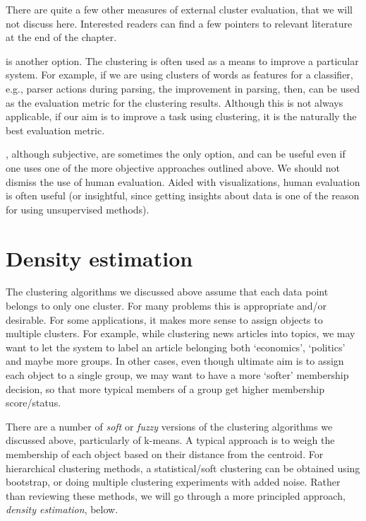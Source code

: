 
There are quite a few other measures of external cluster evaluation,
that we will not discuss here.
Interested readers can find a few pointers to relevant literature
at the end of the chapter.

 is another option.
The clustering is often used as a means to improve a particular system.
For example,
if we are using clusters of words as features for a classifier,
e.g., parser actions during parsing,
the improvement in parsing, then, can be used as the evaluation metric
for the clustering results.
Although this is not always applicable,
if our aim is to improve a task using clustering,
it is the naturally the best evaluation metric.

, although subjective,
are sometimes the only option,
and can be useful even if one uses one of the more objective approaches
outlined above.
We should not dismiss the use of human evaluation.
Aided with visualizations,
human evaluation is often useful
(or insightful, since getting insights about data is
one of the reason for using unsupervised methods).

\section{Density estimation}

The clustering algorithms we discussed above assume that
each data point belongs to only one cluster.
For many problems this is appropriate and/or desirable.
For some applications,
it makes more sense to assign objects to multiple clusters.
For example, while clustering news articles into topics,
we may want to let the system to label an article belonging both
`economics', `politics' and maybe more groups.
In other cases,
even though ultimate aim is to assign each object to a single group,
we may want to have a more `softer' membership decision,
so that more typical members of a group get
higher membership score/status.

There are a number of \emph{soft} or \emph{fuzzy} versions of
the clustering algorithms we discussed above,
particularly of k-means.
A typical approach is to weigh the membership of each object
based on their distance from the centroid.
For hierarchical clustering methods,
a statistical/soft clustering can be obtained using bootstrap,
or doing multiple clustering experiments with added noise.
Rather than reviewing these methods,
we will go through a more principled approach, \emph{density estimation}, below.

